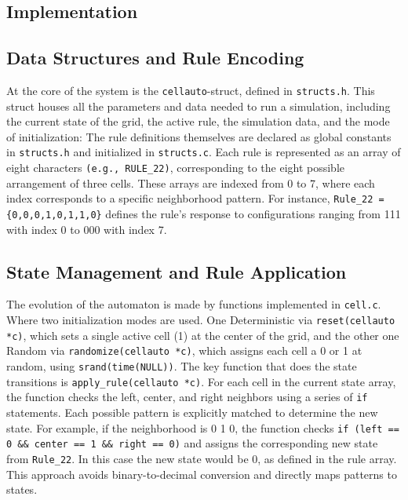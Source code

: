 \documentclass[12pt,a4paper]{article}
\begin{document}
\vspace{1cm}


\subsection{Implementation}
\subsection*{\small Data Structures and Rule Encoding}
At the core of the system is the \texttt{cellauto}-struct, defined in \texttt{structs.h}. This struct houses all the 
parameters and data needed to run a simulation, including the current state of the grid, the active rule, 
the simulation data, and the mode of initialization:
\newline
The rule definitions themselves are declared as global constants in \texttt{structs.h} and initialized in \texttt{structs.c}. 
Each rule is represented as an array of eight characters \texttt{(e.g., RULE\_22)}, corresponding to the eight possible 
arrangement of three cells. These arrays are indexed from 0 to 7, where each index corresponds to a specific 
neighborhood pattern. For instance, \texttt{Rule\_22 = \{0,0,0,1,0,1,1,0\}} defines the rule's response to configurations 
ranging from 111 with index 0 to 000 with index 7. 
\newline

\subsection*{\small State Management and Rule Application}
The evolution of the automaton is made by functions implemented in \texttt{cell.c}. Where two initialization modes are used. 
One Deterministic via \texttt{reset(cellauto *c)}, which sets a single active cell (1) at the center of the grid, and the other 
one Random via \texttt{randomize(cellauto *c)}, which assigns each cell a 0 or 1 at random, using \texttt{srand(time(NULL))}.
\newline
The key function that does the state transitions is \texttt{apply\_rule(cellauto *c)}. For each cell in the 
current state array, the function checks the left, center, and right neighbors using a series of \texttt{if} statements. 
Each possible pattern is explicitly matched to determine the new state. For example, if the neighborhood is 0 1 0, 
the function checks \texttt{if (left == 0 \&\& center == 1 \&\& right == 0)} and assigns the corresponding new state 
from \texttt{Rule\_22}. In this case the new state would be 0, as defined in the rule array.
This approach avoids binary-to-decimal conversion and directly maps patterns to states. 
\newline
\end{document}
